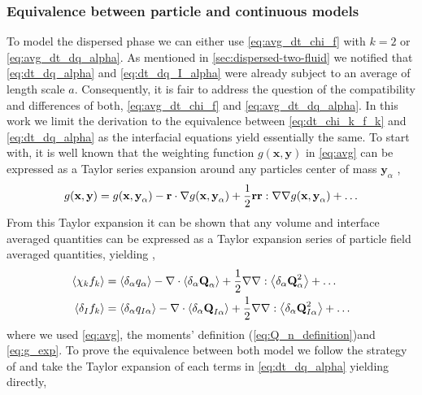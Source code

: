 
\subsubsection*{Equivalence between particle and continuous models}

To model the dispersed phase we can either use \ref{eq:avg_dt_chi_f} with $k=2$ or \ref{eq:avg_dt_dq_alpha}. 
As mentioned in \ref{sec:dispersed-two-fluid} we notified that \ref{eq:dt_dq_alpha} and \ref{eq:dt_dq_I_alpha} were already subject to an average of length scale $a$. 
Consequently, it is fair to address the question of the compatibility and differences of both, \ref{eq:avg_dt_chi_f} and \ref{eq:avg_dt_dq_alpha}. 
In this work we limit the derivation to the equivalence between \ref{eq:dt_chi_k_f_k} and \ref{eq:dt_dq_alpha} as the interfacial equations yield essentially the same. 
To start with, it is well known that the weighting function $g(\textbf{x},\textbf{y})$ in \ref{eq:avg} can be expressed as a Taylor series expansion around any particles center of mass $\textbf{y}_\alpha$ \citep{nott2011suspension, jackson1997locally},
\begin{equation}
    g(\textbf{x},\textbf{y})
    = g(\textbf{x},\textbf{y}_\alpha)
    - \textbf{r} \cdot \mathbf{\nabla} g(\textbf{x},\textbf{y}_\alpha)
    + \frac{1}{2} \textbf{r}\textbf{r} : \mathbf{\nabla}\mathbf{\nabla} g(\textbf{x},\textbf{y}_\alpha)
    + \ldots
    \label{eq:g_exp}
\end{equation} 
From this Taylor expansion it can be shown that any volume and interface averaged quantities can be expressed as a Taylor expansion series of particle field averaged quantities, yielding \citep{nott2011suspension,jackson1997locally,buyevich1979flow},
\begin{align}
    \left<\chi_kf_k\right> 
    &=  \left<\delta_\alpha q_\alpha\right>
        - \mathbf{\nabla} \cdot  
        \left<\delta_\alpha \textbf{Q}_\alpha\right>        
        + \frac{1}{2} \mathbf{\nabla}\mathbf{\nabla} : \left<\delta_\alpha \textbf{Q}_\alpha^2\right>
        + \ldots  \\
    \left<\delta_I f_k\right> 
    &=  \left<\delta_\alpha q_{I\alpha}\right>        
        - \mathbf{\nabla} \cdot \left<\delta_\alpha \textbf{Q}_{I\alpha}\right>
        + \frac{1}{2} \mathbf{\nabla}\mathbf{\nabla} : \left<\delta_\alpha \textbf{Q}_{I\alpha}^{2}\right>
        + \ldots  
    \label{eq:f_exp}
\end{align}      
where we used \ref{eq:avg}, the moments' definition (\ref{eq:Q_n_definition})and \ref{eq:g_exp}. 
To prove the equivalence between both model we follow the strategy of \citep{lhuillier2000bilan} and take the Taylor expansion of each terms in \ref{eq:dt_dq_alpha} yielding directly, 
